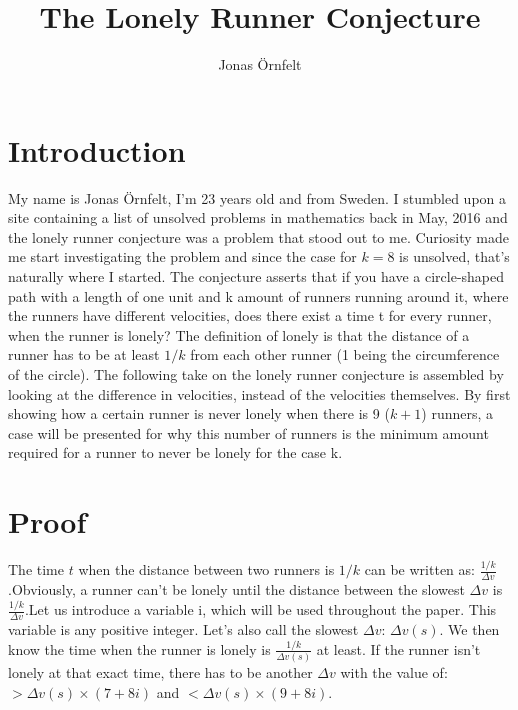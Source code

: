 \documentclass[12pt, a4paper]{article}
\begin{document}
\title{The Lonely Runner Conjecture}
\author{Jonas Örnfelt}
\maketitle

\section*{Introduction}
My name is Jonas Örnfelt, I'm 23 years old and from Sweden. I stumbled upon a site containing a list of unsolved problems in mathematics back in May, 2016 and the lonely runner conjecture was a problem that stood out to me. Curiosity made me start investigating the problem and since the case for $k=8$ is unsolved, that's naturally where I started. 
\newline
\newline
The conjecture asserts that if you have a circle-shaped path with a length of one unit and k amount of runners running around it, where the runners have different velocities, does there exist a time t for every runner, when the runner is lonely? The definition of lonely is that the distance of a runner has to be at least $1/k$ from each other runner (1 being the circumference of the circle).
\newline
\newline
The following take on the lonely runner conjecture is assembled by looking at the difference in velocities, instead of the velocities themselves. By first showing how a certain runner is never lonely when there is 9 ($k+1$) runners, a case will be presented for why this number of runners is the minimum amount required for a runner to never be lonely for the case k.

\section*{Proof}
The time $t$ when the distance between two runners is $1/k$ can be written as: $\frac{1/k}{\Delta v}$.\newline Obviously, a runner can't be lonely until the distance between the slowest $\Delta v$ is $\frac{1/k}{\Delta v}$.\newline Let us introduce a variable i, which will be used throughout the paper. This variable is any positive integer. Let's also call the slowest $\Delta v$: $\Delta v(s)$.\newline
We then know the time when the runner is lonely is $\frac{1/k}{\Delta v(s)}$ at least. If the runner isn't lonely at that exact time, there has to be another ${\Delta v}$ with the value of: $> \Delta v(s)\times(7+8i)$ and $< \Delta v(s)\times(9+8i)$.
\end{document}
